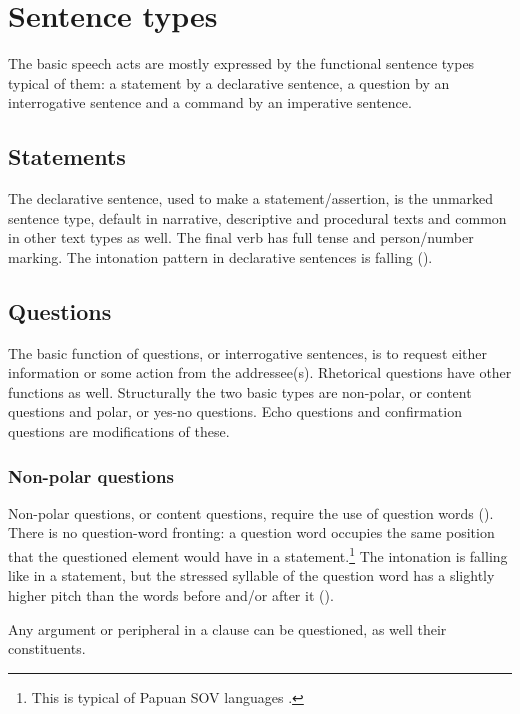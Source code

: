 
\chapter{Sentence types}
{}

The basic speech acts are mostly expressed by the functional sentence types typical of them: a statement by a declarative sentence, a question by an interrogative sentence and a command by an imperative sentence.  

\section{Statements}
{}
The declarative sentence, used to make a statement/assertion, is the unmarked sentence type, default in narrative, descriptive and procedural texts and common in other text types as well. The final verb has full tense and person/number marking. The intonation pattern in declarative sentences is falling (). 

\section{Questions} \label{sec:7.2}
{}
The basic function of questions, or interrogative sentences, is to request either information or some action from the addressee(s). Rhetorical questions have other functions as well. Structurally the two basic types are non-polar, or content questions and polar, or yes-no questions. Echo questions and confirmation questions are modifications of these. 

\subsection{Non-polar questions} \label{sec:7.2.1}
{}
Non-polar questions, or content questions, require the use of question words (). There is no question-word fronting: a question word occupies the same position that the questioned element would have in a statement.\footnote{This is typical of Papuan \textsc{SOV} languages \citep[294]{Reesink1987}.} The intonation is falling like in a statement, but the stressed syllable of the question word has a slightly higher pitch than the words before and/or after it ().

Any argument or peripheral in a clause can be questioned, as well their constituents. 

